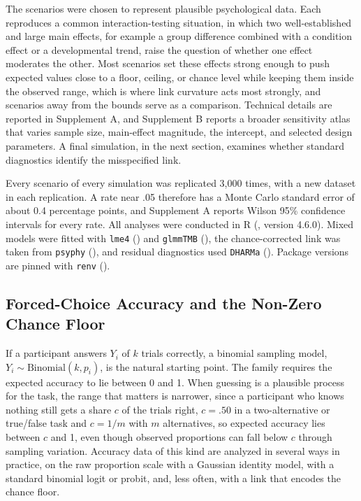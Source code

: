 \documentclass[
  man,
  floatsintext,
  longtable,
  nolmodern,
  notxfonts,
  notimes,
  colorlinks=true,linkcolor=blue,citecolor=blue,urlcolor=blue]{apa7}
\begin{document}
The scenarios were chosen to represent plausible psychological data.
Each reproduces a common interaction-testing situation, in which two
well-established and large main effects, for example a group difference
combined with a condition effect or a developmental trend, raise the
question of whether one effect moderates the other. Most scenarios set
these effects strong enough to push expected values close to a floor,
ceiling, or chance level while keeping them inside the observed range,
which is where link curvature acts most strongly, and scenarios away
from the bounds serve as a comparison. Technical details are reported in
Supplement A, and Supplement B reports a broader sensitivity atlas that
varies sample size, main-effect magnitude, the intercept, and selected
design parameters. A final simulation, in the next section, examines
whether standard diagnostics identify the misspecified link.

Every scenario of every simulation was replicated 3,000 times, with a
new dataset in each replication. A rate near .05 therefore has a Monte
Carlo standard error of about 0.4 percentage points, and Supplement A
reports Wilson 95\% confidence intervals for every rate. All analyses
were conducted in R (,
version 4.6.0). Mixed models were fitted with \texttt{lme4}
() and \texttt{glmmTMB}
(), the chance-corrected
link was taken from \texttt{psyphy}
(), and residual
diagnostics used \texttt{DHARMa} (). Package versions are pinned with \texttt{renv}
().

\subsection{Forced-Choice Accuracy and the Non-Zero Chance
Floor}\label{forced-choice-accuracy-and-the-non-zero-chance-floor}

If a participant answers \(Y_i\) of \(k\) trials correctly, a binomial
sampling model, \(Y_i \sim \mathrm{Binomial}(k, p_i)\), is the natural
starting point. The family requires the expected accuracy to lie between
0 and 1. When guessing is a plausible process for the task, the range
that matters is narrower, since a participant who knows nothing still
gets a share \(c\) of the trials right, \(c = .50\) in a two-alternative
or true/false task and \(c = 1/m\) with \(m\) alternatives, so expected
accuracy lies between \(c\) and 1, even though observed proportions can
fall below \(c\) through sampling variation. Accuracy data of this kind
are analyzed in several ways in practice, on the raw proportion scale
with a Gaussian identity model, with a standard binomial logit or
probit, and, less often, with a link that encodes the chance floor.
\end{document}
